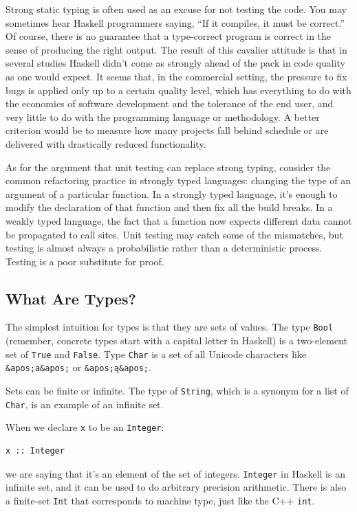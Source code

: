 Strong static typing is often used as an excuse for not testing the
code. You may sometimes hear Haskell programmers saying, ``If it
compiles, it must be correct.'' Of course, there is no guarantee that a
type-correct program is correct in the sense of producing the right
output. The result of this cavalier attitude is that in several studies
Haskell didn't come as strongly ahead of the pack in code quality as one
would expect. It seems that, in the commercial setting, the pressure to
fix bugs is applied only up to a certain quality level, which has
everything to do with the economics of software development and the
tolerance of the end user, and very little to do with the programming
language or methodology. A better criterion would be to measure how many
projects fall behind schedule or are delivered with drastically reduced
functionality.

As for the argument that unit testing can replace strong typing,
consider the common refactoring practice in strongly typed languages:
changing the type of an argument of a particular function. In a strongly
typed language, it's enough to modify the declaration of that function
and then fix all the build breaks. In a weakly typed language, the fact
that a function now expects different data cannot be propagated to call
sites. Unit testing may catch some of the mismatches, but testing is
almost always a probabilistic rather than a deterministic process.
Testing is a poor substitute for proof.

\subsection{What Are Types?}\label{what-are-types}

The simplest intuition for types is that they are sets of values. The
type \texttt{Bool} (remember, concrete types start with a capital letter
in Haskell) is a two-element set of \texttt{True} and \texttt{False}.
Type \texttt{Char} is a set of all Unicode characters like
\texttt{\&apos;a\&apos;} or \texttt{\&apos;ą\&apos;}.

Sets can be finite or infinite. The type of \texttt{String}, which is a
synonym for a list of \texttt{Char}, is an example of an infinite set.

When we declare \texttt{x} to be an \texttt{Integer}:

\begin{verbatim}
x :: Integer
\end{verbatim}

we are saying that it's an element of the set of integers.
\texttt{Integer} in Haskell is an infinite set, and it can be used to do
arbitrary precision arithmetic. There is also a finite-set \texttt{Int}
that corresponds to machine type, just like the C++ \texttt{int}.

